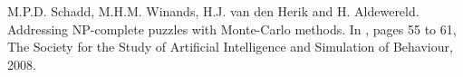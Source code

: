 \documentclass[twoside]{article}
\begin{document}
\begin{multicols}{2}
\begin{thebibliography}{99} %

M.P.D. Schadd, M.H.M. Winands, H.J. van den Herik and H. Aldewereld. Addressing NP-complete
puzzles with Monte-Carlo methods. In
, pages 55 to 61, The Society for the Study of Artiﬁcial Intelligence and Simulation of Behaviour, 2008.
 
\end{thebibliography}


\end{multicols}
\end{document}
